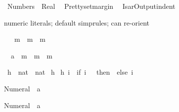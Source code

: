 %
\begin{isabellebody}%
\def\isabellecontext{Numbers}%
\isanewline
{}\ Numbers\ \ Real\ \isanewline
\isanewline
\isamarkupfalse%
\ {\isachardoublequote}Pretty{\isachardot}setmargin\ {}{}{\isachardoublequote}\isanewline
\isamarkupfalse%
\ {\isachardoublequote}IsarOutput{\isachardot}indent\ {\isacharcolon}{\isacharequal}\ {}{\isachardoublequote}\isamarkupfalse%
%
\begin{isamarkuptext}%
numeric literals; default simprules; can re-orient%
\end{isamarkuptext}%
\isamarkuptrue%
\ {\isachardoublequote}{}\ {\isacharasterisk}\ m\ {\isacharequal}\ m\ {\isacharplus}\ m{\isachardoublequote}\isamarkupfalse%
%
\begin{isamarkuptxt}%
\begin{isabelle}%
\ {}{\isachardot}\ {\isacharparenleft}{}{\isasymColon}{\isacharprime}a{\isacharparenright}\ {\isacharasterisk}\ m\ {\isacharequal}\ m\ {\isacharplus}\ m%
\end{isabelle}%
\end{isamarkuptxt}%
\isamarkuptrue%
\isanewline
\isanewline
\isamarkupfalse%
\ h\ {\isacharcolon}{\isacharcolon}\ {\isachardoublequote}nat\ {\isasymRightarrow}\ nat{\isachardoublequote}\isanewline
\isamarkupfalse%
\ h\ {\isachardoublequote}{\isacharbraceleft}{\isacharbraceright}{\isachardoublequote}\isanewline
{\isachardoublequote}h\ i\ {\isacharequal}\ {\isacharparenleft}if\ i\ {\isacharequal}\ {}\ then\ {}\ else\ i{\isacharparenright}{\isachardoublequote}\isamarkupfalse%
%
\begin{isamarkuptext}%
%
\end{isamarkuptext}%
\isamarkuptrue%
%
\begin{isamarkuptext}%
\begin{isabelle}%
Numeral{}\ {\isacharequal}\ {\isacharparenleft}{}{\isasymColon}{\isacharprime}a{\isacharparenright}%
\end{isabelle}

\begin{isabelle}%
Numeral{}\ {\isacharequal}\ {\isacharparenleft}{}{\isasymColon}{\isacharprime}a{\isacharparenright}%
\end{isabelle}


\end{isamarkuptext}
\end{isabellebody}
